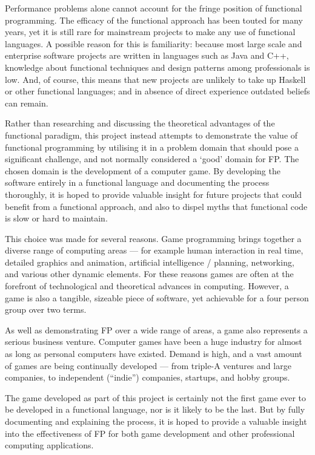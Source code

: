 Performance problems alone cannot account for the fringe position of functional programming. The efficacy of the functional approach has been touted for many years, yet it is still rare for mainstream projects to make any use of functional languages. A possible reason for this is familiarity: because most large scale and enterprise software projects are written in languages such as Java and C++, knowledge about functional techniques and design patterns among professionals is low. And, of course, this means that new projects are unlikely to take up Haskell or other functional languages; and in absence of direct experience outdated beliefs can remain.

Rather than researching and discussing the theoretical advantages of the functional paradigm, this project instead attempts to demonstrate the value of functional programming by utilising it in a problem domain that should pose a significant challenge, and not normally considered a `good' domain for FP. The chosen domain is the development of a computer game. By developing the software entirely in a functional language and documenting the process thoroughly, it is hoped to provide valuable insight for future projects that could benefit from a functional approach, and also to dispel myths that functional code is slow or hard to maintain.

This choice was made for several reasons. Game programming brings together a diverse range of computing areas --- for example human interaction in real time, detailed graphics and animation, artificial intelligence / planning, networking, and various other dynamic elements. For these reasons games are often at the forefront of technological and theoretical advances in computing. However, a game is also a tangible, sizeable piece of software, yet achievable for a four person group over two terms. 

As well as demonstrating FP over a wide range of areas, a game also represents a serious business venture.\cite[1em]{essentialFacts2012} Computer games have been a huge industry for almost as long as personal computers have existed. Demand is high, and a vast amount of games are being continually developed --- from triple-A ventures and large companies, to independent (``indie'') companies, startups, and hobby groups.

The game developed as part of this project is certainly not the first game ever to be developed in a functional language, nor is it likely to be the last. But by fully documenting and explaining the process, it is hoped to provide a valuable insight into the effectiveness of FP for both game development and other professional computing applications.

